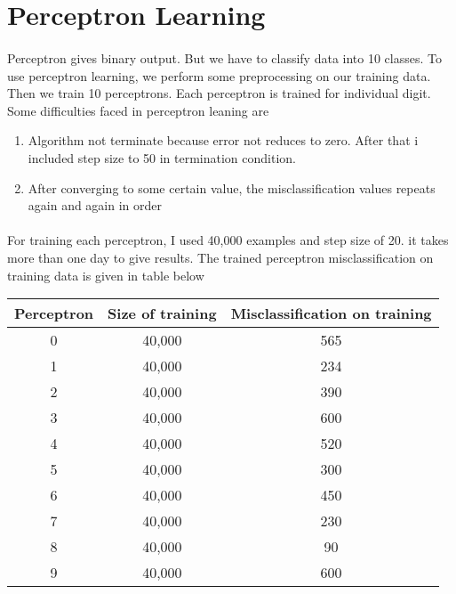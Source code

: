\documentclass[]{report}
\begin{document}
\section{Perceptron Learning}
\paragraph{}Perceptron gives binary output. But we have to classify data into 10 classes. To use perceptron learning, we perform some preprocessing on our training data. Then we train 10 perceptrons. Each perceptron is trained for individual digit. Some difficulties faced in perceptron leaning are
\begin{enumerate}
	\item Algorithm not terminate because error not reduces to zero. After that i included step size to 50 in termination condition.
	\item After converging to some certain value, the misclassification values repeats again and again in order
\end{enumerate}
\paragraph{} For training each perceptron, I used 40,000 examples and step size of 20. it takes more than one day to give results. The trained perceptron misclassification on training data is given in table below 
\begin{center}
	\begin{tabular}{||c c c||} 
		\hline
		Perceptron & Size of training & Misclassification on training \\ [0.5ex] 
		\hline
		0 & 40,000 & 565  \\ 
		\hline
		1 & 40,000 & 234  \\ 
		\hline
		2 & 40,000 & 390  \\ 
		\hline
		3 & 40,000 & 600  \\ 
		\hline
		4 & 40,000 & 520  \\ 
		\hline
		5 & 40,000 & 300  \\ 
		\hline
		6 & 40,000 &  450 \\ 
		\hline
		7 & 40,000 & 230  \\ 
		\hline
		8 & 40,000 & 90  \\ 
		\hline
		9 & 40,000 & 600  \\ 
		[1ex] 
		\hline
	\end{tabular}
\end{center}
\end{document}
